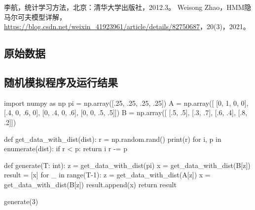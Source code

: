 \documentclass[a4paper,12pt]{ctexart}     %
\begin{document}
	\begin{thebibliography}{99}    %
		李航，统计学习方法，北京：清华大学出版社，2012.3。     
		 Weisong Zhao，HMM隐马尔可夫模型详解，\url{https://blog.csdn.net/weixin_41923961/article/details/82750687}，20(3)，2021。
		
		
		
		
	\end{thebibliography}

	
	
	
	
	\begin{appendix}

	\begin{center}
		\section{}
	\end{center}

	\subsection{原始数据}
	\subsection{随机模拟程序及运行结果}
	\begin{python}
import numpy as np
pi = np.array([.25, .25, .25, .25])
A = np.array([
[0,  1,  0, 0],
[.4, 0, .6, 0],
[0, .4, 0, .6],
[0, 0, .5, .5]])
B = np.array([
[.5, .5],
[.3, .7],
[.6, .4],
[.8, .2]])

def get_data_with_dist(dist):
	r = np.random.rand()
	print(r)
	for i, p in enumerate(dist):
	if r < p: return i
	r -= p

def generate(T: int):
	z = get_data_with_dist(pi)    
	x = get_data_with_dist(B[z])  
	result = [x]
	for _ in range(T-1):        
	z = get_data_with_dist(A[z])
	x = get_data_with_dist(B[z])
	result.append(x)
	return result

generate(3)
		
		\end{python}
	
	\end{appendix}
\end{document}
